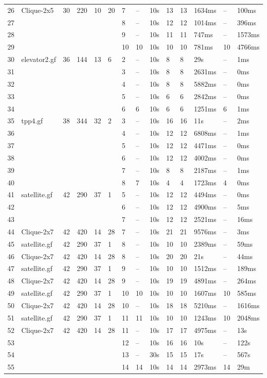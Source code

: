 \documentclass{article}
\begin{document}
\begin{longtable}{|l |l |l |l |l |l |l |l |l |l |l |l |l |l |}
26&Clique-2x5&30&220&10&20&7&--&10s&13&13&1634ms&--&100ms\\
27&&&&&&8&--&10s&12&12&1014ms&--&396ms\\
28&&&&&&9&--&10s&11&11&747ms&--&1573ms\\
29&&&&&&10&10&10s&10&10&781ms&10&4766ms\\
30&elevator2.gf&36&144&13&6&2&--&10s&8&8&29s&--&1ms\\
31&&&&&&3&--&10s&8&8&2631ms&--&0ms\\
32&&&&&&4&--&10s&8&8&5882ms&--&0ms\\
33&&&&&&5&--&10s&6&6&2842ms&--&0ms\\
34&&&&&&6&6&10s&6&6&1251ms&6&1ms\\
35&tpp4.gf&38&344&32&2&3&--&10s&16&16&11s&--&2ms\\
36&&&&&&4&--&10s&12&12&6808ms&--&1ms\\
37&&&&&&5&--&10s&12&12&4471ms&--&0ms\\
38&&&&&&6&--&10s&12&12&4002ms&--&0ms\\
39&&&&&&7&--&10s&8&8&2187ms&--&1ms\\
40&&&&&&8&7&10s&4&4&1723ms&4&0ms\\
41&satellite.gf&42&290&37&1&5&--&10s&12&12&4494ms&--&0ms\\
42&&&&&&6&--&10s&12&12&4900ms&--&5ms\\
43&&&&&&7&--&10s&12&12&2521ms&--&16ms\\
44&Clique-2x7&42&420&14&28&7&--&10s&21&21&9576ms&--&3ms\\
45&satellite.gf&42&290&37&1&8&--&10s&10&10&2389ms&--&59ms\\
46&Clique-2x7&42&420&14&28&8&--&10s&20&20&21s&--&44ms\\
47&satellite.gf&42&290&37&1&9&--&10s&10&10&1512ms&--&189ms\\
48&Clique-2x7&42&420&14&28&9&--&10s&19&19&4891ms&--&264ms\\
49&satellite.gf&42&290&37&1&10&10&10s&10&10&1607ms&10&585ms\\
50&Clique-2x7&42&420&14&28&10&--&10s&18&18&5210ms&--&1616ms\\
51&satellite.gf&42&290&37&1&11&11&10s&10&10&1243ms&10&2048ms\\
52&Clique-2x7&42&420&14&28&11&--&10s&17&17&4975ms&--&13s\\
53&&&&&&12&--&10s&16&16&10s&--&122s\\
54&&&&&&13&--&30s&15&15&17s&--&567s\\
55&&&&&&14&14&10s&14&14&2973ms&14&29m\\

\end{longtable}
\end{document}
